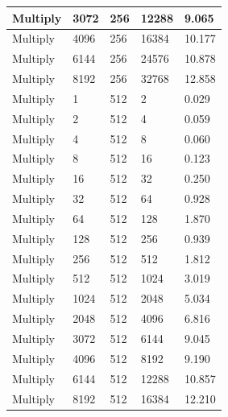 \documentclass{article}
\begin{document}
\begin{longtable}{|l|l|l|l|l|}
Multiply           & 3072 & 256         & 12288             & 9.065             \\ \hline
Multiply           & 4096 & 256         & 16384             & 10.177            \\ \hline
Multiply           & 6144 & 256         & 24576             & 10.878            \\ \hline
Multiply           & 8192 & 256         & 32768             & 12.858            \\ \hline
Multiply           & 1    & 512         & 2                 & 0.029             \\ \hline
Multiply           & 2    & 512         & 4                 & 0.059             \\ \hline
Multiply           & 4    & 512         & 8                 & 0.060             \\ \hline
Multiply           & 8    & 512         & 16                & 0.123             \\ \hline
Multiply           & 16   & 512         & 32                & 0.250             \\ \hline
Multiply           & 32   & 512         & 64                & 0.928             \\ \hline
Multiply           & 64   & 512         & 128               & 1.870             \\ \hline
Multiply           & 128  & 512         & 256               & 0.939             \\ \hline
Multiply           & 256  & 512         & 512               & 1.812             \\ \hline
Multiply           & 512  & 512         & 1024              & 3.019             \\ \hline
Multiply           & 1024 & 512         & 2048              & 5.034             \\ \hline
Multiply           & 2048 & 512         & 4096              & 6.816             \\ \hline
Multiply           & 3072 & 512         & 6144              & 9.045             \\ \hline
Multiply           & 4096 & 512         & 8192              & 9.190             \\ \hline
Multiply           & 6144 & 512         & 12288             & 10.857            \\ \hline
Multiply           & 8192 & 512         & 16384             & 12.210            \\ \hline

\end{longtable}
\end{document}
